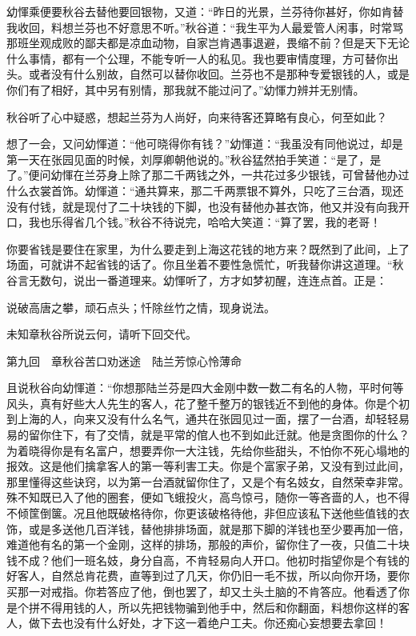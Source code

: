 \documentclass[12pt,UTF8]{ctexbook}
\begin{document}
{{{幼惲乘便要秋谷去替他要回银物，又道：“昨日的光景，兰芬待你甚好，你如肯替我收回，料想兰芬也不好意思不听。”秋谷道：“我生平为人最爱管人闲事，时常骂那班坐观成败的鄙夫都是凉血动物，自家岂肯遇事退避，畏缩不前？但是天下无论什么事情，都有一个公理，不能专听一人的私见。我也要审情度理，方可替你出头。或者没有什么别故，自然可以替你收回。兰芬也不是那种专爱银钱的人，或是你们有了相好，其中另有别情，那我就不能过问了。”幼惲力辨并无别情。

秋谷听了心中疑惑，想起兰芬为人尚好，向来待客还算略有良心，何至如此？

想了一会，又问幼惲道：“他可晓得你有钱？”幼惲道：“我虽没有同他说过，却是第一天在张园见面的时候，刘厚卿朝他说的。”秋谷猛然拍手笑道：“是了，是了。”便问幼惲在兰芬身上除了那二千两钱之外，一共花过多少银钱，可曾替他办过什么衣裳首饰。幼惲道：“通共算来，那二千两票银不算外，只吃了三台酒，现还没有付钱，就是现付了二十块钱的下脚，也没有替他办甚衣饰，他又并没有向我开口，我也乐得省几个钱。”秋谷不待说完，哈哈大笑道：“算了罢，我的老哥！

你要省钱是要住在家里，为什么要走到上海这花钱的地方来？既然到了此间，上了场面，可就讲不起省钱的话了。你且坐着不要性急慌忙，听我替你讲这道理。“秋谷言无数句，说出一番道理来。幼惲听了，方才如梦初醒，连连点首。正是：

说破高唐之攀，顽石点头；忏除丝竹之情，现身说法。

未知章秋谷所说云何，请听下回交代。





第九回　章秋谷苦口劝迷途　陆兰芳惊心怜薄命





且说秋谷向幼惲道：“你想那陆兰芬是四大金刚中数一数二有名的人物，平时何等风头，真有好些大人先生的客人，花了整千整万的银钱近不到他的身体。你是个初到上海的人，向来又没有什么名气，通共在张园见过一面，摆了一台酒，却轻轻易易的留你住下，有了交情，就是平常的倌人也不到如此迁就。他是贪图你的什么？为着晓得你是有名富户，想要弄你一大注钱，先给你些甜头，不怕你不死心塌地的报效。这是他们擒拿客人的第一等利害工夫。你是个富家子弟，又没有到过此间，那里懂得这些诀窍，以为第一台酒就留你住了，又是个有名妓女，自然荣幸非常。殊不知既已入了他的圈套，便如飞蛾投火，高鸟惊弓，随你一等吝啬的人，也不得不倾筐倒箧。况且他既破格待你，你更该破格待他，非但应该私下送他些值钱的衣饰，或是多送他几百洋钱，替他排排场面，就是那下脚的洋钱也至少要再加一倍，难道他有名的第一个金刚，这样的排场，那般的声价，留你住了一夜，只值二十块钱不成？他们一班名妓，身分自高，不肯轻易向人开口。他初时指望你是个有钱的好客人，自然总肯花费，直等到过了几天，你仍旧一毛不拔，所以向你开场，要你买那一对戒指。你若答应了他，倒也罢了，却又土头土脑的不肯答应。他看透了你是个拼不得用钱的人，所以先把钱物骗到他手中，然后和你翻面，料想你这样的客人，做下去也没有什么好处，才下这一着绝户工夫。你还痴心妄想要去拿回！

}}}
\end{document}
